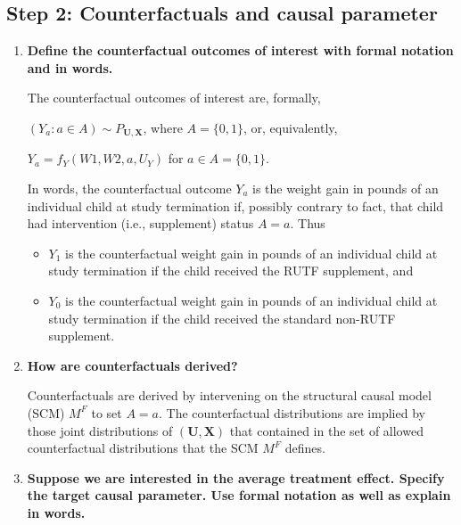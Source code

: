 \documentclass{article}\usepackage[]{graphicx}\usepackage[]{xcolor}
\begin{document}
  \subsection{Step 2: Counterfactuals and causal parameter}
  
  \begin{enumerate}[label=\textbf{\alph*.}]
  
    \item \textbf{Define the counterfactual outcomes of interest with formal notation and in words.}
    
    The counterfactual outcomes of interest are, formally, 
    
    $(Y_a : a \in A) \sim P_{\bm{U},\bm{X}}$, where $A = \{0, 1\}$, or, equivalently,
    
    $Y_a = f_{Y}(W1, W2, a, U_Y)$ for $a \in A = \{0, 1\}.$
    
    In words, the counterfactual outcome $Y_a$ is the weight gain in pounds of an individual child at study termination if, possibly contrary to fact, that child had intervention (i.e., supplement) status $A = a$.  Thus
    
    \begin{itemize}
    
      \item $Y_1$ is the counterfactual weight gain in pounds of an individual child at study termination if the child received the RUTF supplement, and
      
      \item $Y_0$ is the counterfactual weight gain in pounds of an individual child at study termination if the child received the standard non-RUTF supplement.
      
    \end{itemize}

    \item \textbf{How are counterfactuals derived?}
    
    Counterfactuals are derived by intervening on the structural causal model (SCM) $M^F$ to set $A = a$. The counterfactual distributions are implied by those joint distributions of $(\bm{U}, \bm{X})$ that contained in the set of allowed counterfactual distributions that the SCM $M^F$ defines.
    
    \item \textbf{Suppose we are interested in the average treatment effect. Specify the target causal parameter. Use formal notation as well as explain in words.}
    

\end{enumerate}
\end{document}
